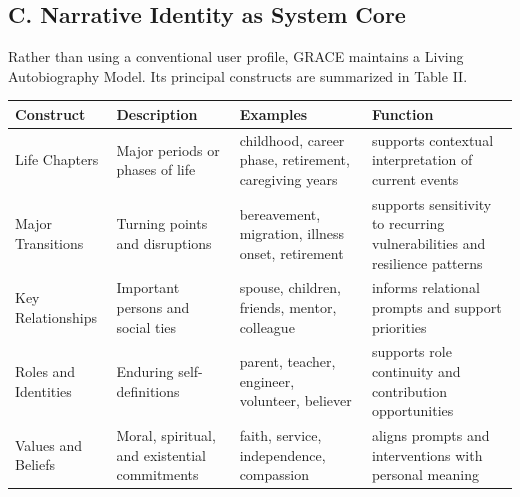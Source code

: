 \documentclass[
  journal,
]{IEEEtran}%
\newcounter{none} %
\begin{document}
\subsection{C. Narrative Identity as System
Core}\label{c.-narrative-identity-as-system-core}

Rather than using a conventional user profile, GRACE maintains a Living
Autobiography Model. Its principal constructs are summarized in Table
II.

{\def\LTcaptype{none} %
\begin{longtable}[]{@{}
  >{\raggedright\arraybackslash}p{}
  >{\raggedright\arraybackslash}p{}
  >{\raggedright\arraybackslash}p{}
  >{\raggedright\arraybackslash}p{}@{}}
\toprule\noalign{}
\begin{minipage}[b]{\linewidth}\raggedright
Construct
\end{minipage} & \begin{minipage}[b]{\linewidth}\raggedright
Description
\end{minipage} & \begin{minipage}[b]{\linewidth}\raggedright
Examples
\end{minipage} & \begin{minipage}[b]{\linewidth}\raggedright
Function
\end{minipage} \\
\midrule\noalign{}
\endhead
\bottomrule\noalign{}
\endlastfoot
Life Chapters & Major periods or phases of life & childhood, career
phase, retirement, caregiving years & supports contextual interpretation
of current events \\
Major Transitions & Turning points and disruptions & bereavement,
migration, illness onset, retirement & supports sensitivity to recurring
vulnerabilities and resilience patterns \\
Key Relationships & Important persons and social ties & spouse,
children, friends, mentor, colleague & informs relational prompts and
support priorities \\
Roles and Identities & Enduring self-definitions & parent, teacher,
engineer, volunteer, believer & supports role continuity and
contribution opportunities \\
Values and Beliefs & Moral, spiritual, and existential commitments &
faith, service, independence, compassion & aligns prompts and
interventions with personal meaning \\

\end{longtable}}
\end{document}
